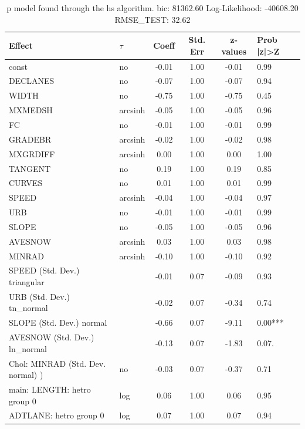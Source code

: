 \begin{table}
	\caption{p model found through the hs algorithm. bic: 81362.60 Log-Likelihood: -40608.20 RMSE_TEST: 32.62}
	\begin{center}
		\begin{tabular}{|l|l|c|c|c|l|}
			\hline
			Effect & $\tau$ & Coeff & Std. Err & z-values & Prob |z|>Z \\
			\hline
			const & no & -0.01 & 1.00 & -0.01 & 0.99 \\
			\hline
			DECLANES & no & -0.07 & 1.00 & -0.07 & 0.94 \\
			\hline
			WIDTH & no & -0.75 & 1.00 & -0.75 & 0.45 \\
			\hline
			MXMEDSH & arcsinh & -0.05 & 1.00 & -0.05 & 0.96 \\
			\hline
			FC & no & -0.01 & 1.00 & -0.01 & 0.99 \\
			\hline
			GRADEBR & arcsinh & -0.02 & 1.00 & -0.02 & 0.98 \\
			\hline
			MXGRDIFF & arcsinh & 0.00 & 1.00 & 0.00 & 1.00 \\
			\hline
			TANGENT & no & 0.19 & 1.00 & 0.19 & 0.85 \\
			\hline
			CURVES & no & 0.01 & 1.00 & 0.01 & 0.99 \\
			\hline
			SPEED & arcsinh & -0.04 & 1.00 & -0.04 & 0.97 \\
			\hline
			URB & no & -0.01 & 1.00 & -0.01 & 0.99 \\
			\hline
			SLOPE & no & -0.05 & 1.00 & -0.05 & 0.96 \\
			\hline
			AVESNOW & arcsinh & 0.03 & 1.00 & 0.03 & 0.98 \\
			\hline
			MINRAD & arcsinh & -0.10 & 1.00 & -0.10 & 0.92 \\
			\hline
			SPEED (Std. Dev.) triangular &  & -0.01 & 0.07 & -0.09 & 0.93 \\
			\hline
			URB (Std. Dev.) tn_normal &  & -0.02 & 0.07 & -0.34 & 0.74 \\
			\hline
			SLOPE (Std. Dev.) normal &  & -0.66 & 0.07 & -9.11 & 0.00*** \\
			\hline
			AVESNOW (Std. Dev.) ln_normal &  & -0.13 & 0.07 & -1.83 & 0.07. \\
			\hline
			 Chol: MINRAD (Std. Dev. normal) ) & no & -0.03 & 0.07 & -0.37 & 0.71 \\
			\hline
			main: LENGTH: hetro group 0 & log & 0.06 & 1.00 & 0.06 & 0.95 \\
			\hline
			ADTLANE: hetro group 0 & log & 0.07 & 1.00 & 0.07 & 0.94 \\

\end{tabular}
\end{center}
\end{table}
